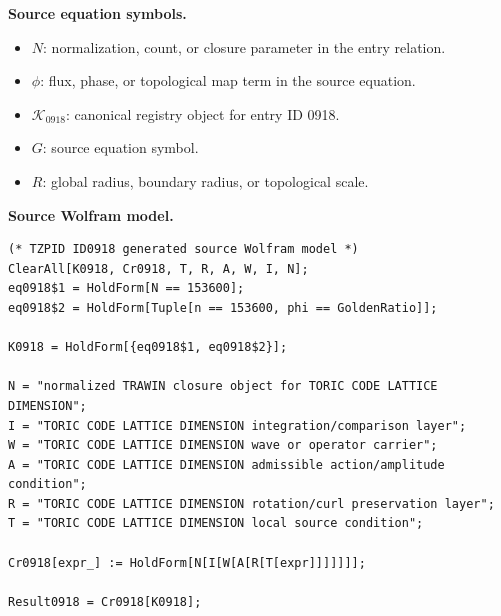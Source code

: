 \begin{minipage}[t]{0.49\linewidth}
\begingroup
\small
\raggedright
\textbf{Source equation symbols.}\par
\begin{itemize}[leftmargin=1.35em,itemsep=1pt,topsep=1pt,parsep=0pt]
    \item $N$: normalization, count, or closure parameter in the entry relation.
    \item $\phi$: flux, phase, or topological map term in the source equation.
    \item $\mathcal{K}_{0918}$: canonical registry object for entry ID 0918.
    \item $G$: source equation symbol.
    \item $R$: global radius, boundary radius, or topological scale.
\end{itemize}
\endgroup
\end{minipage}\hfill
\begin{minipage}[t]{0.47\linewidth}
\begingroup
\scriptsize
\raggedright
\textbf{Source Wolfram model.}\par
\begin{Verbatim}[fontsize=\tiny,breaklines=true,breakanywhere=true]
(* TZPID ID0918 generated source Wolfram model *)
ClearAll[K0918, Cr0918, T, R, A, W, I, N];
eq0918$1 = HoldForm[N == 153600];
eq0918$2 = HoldForm[Tuple[n == 153600, phi == GoldenRatio]];

K0918 = HoldForm[{eq0918$1, eq0918$2}];

N = "normalized TRAWIN closure object for TORIC CODE LATTICE DIMENSION";
I = "TORIC CODE LATTICE DIMENSION integration/comparison layer";
W = "TORIC CODE LATTICE DIMENSION wave or operator carrier";
A = "TORIC CODE LATTICE DIMENSION admissible action/amplitude condition";
R = "TORIC CODE LATTICE DIMENSION rotation/curl preservation layer";
T = "TORIC CODE LATTICE DIMENSION local source condition";

Cr0918[expr_] := HoldForm[N[I[W[A[R[T[expr]]]]]]];

Result0918 = Cr0918[K0918];
\end{Verbatim}
\endgroup
\end{minipage}

